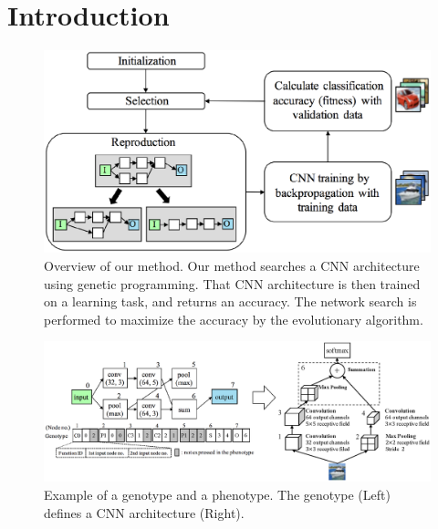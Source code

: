 
\section{Introduction}
\begin{figure}[t]
\includegraphics[scale=0.65]{images/overview.eps}
\caption{Overview of our method. Our method searches a CNN architecture using genetic programming. That CNN architecture is then trained on a learning task, and returns an accuracy. The network search is performed to maximize the accuracy by the evolutionary algorithm. }
\label{overview}
\end{figure}

\begin{figure}[t]
\includegraphics[scale=0.7]{images/genotype.eps}
\caption{Example of a genotype and a phenotype. The genotype (Left) defines a CNN architecture (Right).}
\label{genotype}
\end{figure}

